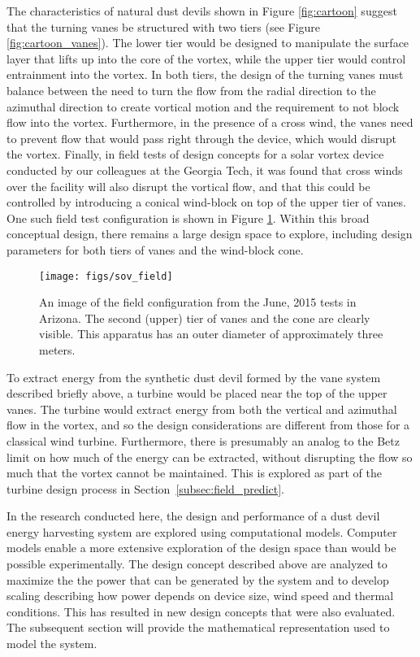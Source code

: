 The characteristics of natural dust devils shown in Figure
\ref{fig:cartoon} suggest that the turning vanes be structured with two
tiers (see Figure \ref{fig:cartoon_vanes}). The lower tier would be
designed to manipulate the surface layer 
that lifts up into the core of the vortex, while the upper tier would
control entrainment into the vortex. In both tiers, the design of the
turning vanes must balance between the need to turn the flow from the
radial direction to the azimuthal direction to create vortical motion
and the requirement to not block flow into the vortex. Furthermore, in
the presence of a cross wind, the vanes need to prevent flow that
would pass right through the device, which would disrupt the vortex.
Finally, in field tests of design concepts for a solar vortex device
conducted by our colleagues at the Georgia Tech, it was found that cross
winds over the facility will also disrupt the vortical flow, and that
this could be controlled by introducing a conical wind-block on top of
the upper tier of vanes. One such field test configuration is shown in
Figure \ref{fig:field_test}. Within this broad conceptual design, there
remains a large design space to explore, including design parameters for
both tiers of vanes and the wind-block cone.

  \begin{figure}[!htb]
    \begin{center}
     \texttt{[image: figs/sov\_field]}
     \caption{An image of the field configuration from the June, 2015
     tests in Arizona. The second (upper) tier of vanes and the cone are
     clearly visible. This apparatus has an outer diameter of
     approximately three meters.}
     \label{fig:field_test}
    \end{center}
  \end{figure}

To extract energy from the synthetic dust devil formed by the vane
system described briefly above, a turbine would be placed near the top
of the upper vanes. The turbine would extract energy from both the
vertical and azimuthal flow in the vortex, and so the design
considerations are different from those for a classical wind turbine.
Furthermore, there is presumably an analog to the Betz limit on how
much of the energy can be extracted, without disrupting the flow so
much that the vortex cannot be maintained. This is explored as part of
the turbine design process in Section~\ref{subsec:field_predict}. 

In the research conducted here, the design and performance of a dust
devil energy harvesting system are explored using computational
models. Computer models enable a more extensive exploration of
the design space than would be possible experimentally. The design
concept described above are analyzed to maximize the the
power that can be generated by the system and to develop scaling
describing how power depends on device size, wind speed and thermal
conditions. This has resulted in new design concepts that were also 
evaluated. The subsequent section will provide the mathematical
representation used to model the system.  

